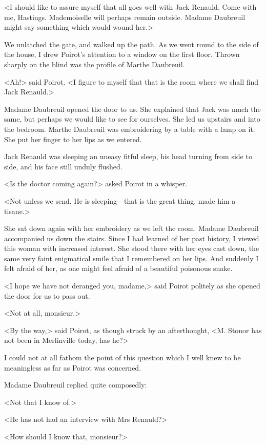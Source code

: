  <I should like to assure myself that all goes well with Jack Renauld. Come with me, Hastings. Mademoiselle will perhaps remain outside. Madame Daubreuil might say something which would wound her.> 

 We unlatched the gate, and walked up the path. As we went round to the side of the house, I drew Poirot's attention to a window on the first floor. Thrown sharply on the blind was the profile of Marthe Daubreuil. 

 <Ah!> said Poirot. <I figure to myself that that is the room where we shall find Jack Renauld.> 

 Madame Daubreuil opened the door to us. She explained that Jack was much the same, but perhaps we would like to see for ourselves. She led us upstairs and into the bedroom. Marthe Daubreuil was embroidering by a table with a lamp on it. She put her finger to her lips as we entered. 

 Jack Renauld was sleeping an uneasy fitful sleep, his head turning from side to side, and his face still unduly flushed. 

 <Is the doctor coming again?> asked Poirot in a whisper. 

 <Not unless we send. He is sleeping—that is the great thing.  made him a tisane.> 

 She sat down again with her embroidery as we left the room. Madame Daubreuil accompanied us down the stairs. Since I had learned of her past history, I viewed this woman with increased interest. She stood there with her eyes cast down, the same very faint enigmatical smile that I remembered on her lips. And suddenly I felt afraid of her, as one might feel afraid of a beautiful poisonous snake. 

 <I hope we have not deranged you, madame,> said Poirot politely as she opened the door for us to pass out. 

 <Not at all, monsieur.> 

 <By the way,> said Poirot, as though struck by an afterthought, <M. Stonor has not been in Merlinville today, has he?> 

 I could not at all fathom the point of this question which I well knew to be meaningless as far as Poirot was concerned. 

 Madame Daubreuil replied quite composedly: 

 <Not that I know of.> 

 <He has not had an interview with Mrs Renauld?> 

 <How should I know that, monsieur?> 

